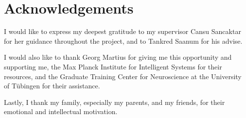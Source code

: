 \chapter*{Acknowledgements}

I would like to express my deepest gratitude to my supervisor Cansu Sancaktar for her guidance throughout the project, and to Tankred Saanum for his advise.\\\vspace{-12pt}

I would also like to thank Georg Martius for giving me this opportunity and supporting me, the Max Planck Institute for Intelligent Systems for their resources, and the Graduate Training Center for Neuroscience at the University of Tübingen for their assistance.\\\vspace{-12pt}

Lastly, I thank my family, especially my parents, and my friends, for their emotional and intellectual motivation.
